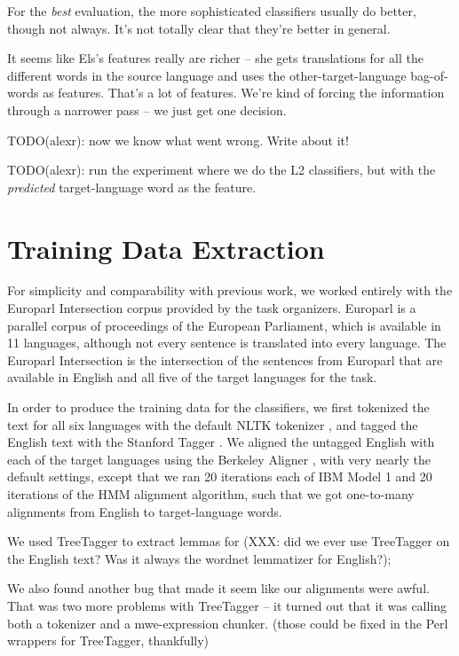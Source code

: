 \documentclass[11pt,letterpaper]{article}
\begin{document}
For the \emph{best} evaluation, the more sophisticated classifiers usually do
better, though not always. It's not totally clear that they're better in
general.

It seems like Els's features really are richer -- she gets translations for all
the different words in the source language and uses the other-target-language
bag-of-words as features. That's a lot of features. We're kind of forcing the
information through a narrower pass -- we just get one decision.

TODO(alexr): now we know what went wrong. Write about it!

TODO(alexr): run the experiment where we do the L2 classifiers, but with the
\emph{predicted} target-language word as the feature.


\section{Training Data Extraction}
For simplicity and comparability with previous work, we worked entirely with
the Europarl Intersection corpus provided by the task organizers.  Europarl
\cite{europarl} is a parallel corpus of proceedings of the European
Parliament, which is available in 11 languages, although not every sentence is
translated into every language. The Europarl Intersection is the intersection
of the sentences from Europarl that are available in English and all five of
the target languages for the task.

In order to produce the training data for the classifiers, we first tokenized
the text for all six languages with the default NLTK tokenizer \cite{nltkbook},
and tagged the English text with the Stanford Tagger
\cite{Toutanova03feature-richpart-of-speech}. We aligned the untagged English
with each of the target languages using the Berkeley Aligner
\cite{denero-klein:2007:ACLMain}, with very nearly the default settings, except
that we ran 20 iterations each of IBM Model 1 and 20 iterations of the HMM
alignment algorithm, such that we got one-to-many alignments from English to
target-language words.

We used TreeTagger to extract lemmas for \cite{Schmid95improvementsin}
(XXX: did we ever use TreeTagger on the English text? Was it always the wordnet
lemmatizer for English?);

We also found another bug that made it seem like our alignments were awful.
That was two more problems with TreeTagger -- it turned out that it was calling
both a tokenizer and a mwe-expression chunker. (those could be fixed in the
Perl wrappers for TreeTagger, thankfully)
\end{document}
